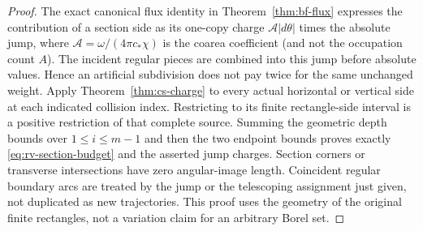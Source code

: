 \begin{proof}
The exact canonical flux identity in Theorem~\ref{thm:bf-flux}
expresses the contribution of a section side as its one-copy charge
$\mathscr A|d\theta|$ times the absolute jump, where
$\mathscr A=\omega/(4\pi c_*\chi)$ is the coarea coefficient
(and not the occupation count $A$). The incident regular pieces
are combined into this jump before absolute values. Hence an
artificial subdivision does not pay twice for the same unchanged
weight. Apply Theorem~\ref{thm:cs-charge} to every actual horizontal
or vertical side at each indicated collision index. Restricting to
its finite rectangle-side interval is a positive restriction of
that complete source. Summing the geometric depth bounds over
$1\le i\le m-1$ and then the two endpoint bounds proves exactly
\eqref{eq:rv-section-budget} and the asserted jump charges.
Section corners or transverse intersections have zero angular-image
length. Coincident regular boundary arcs are treated by the jump
or the telescoping assignment just given, not duplicated as new
trajectories. This proof uses the geometry of the original finite
rectangles, not a variation claim for an arbitrary Borel set.
\end{proof}

